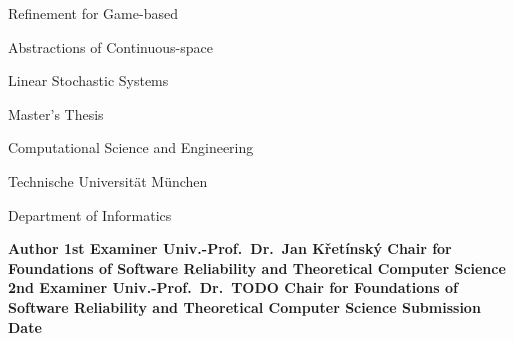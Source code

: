 \startalignment[flushright]
    \dontleavehmode
\stopalignment

\blank[25mm]

{ \CoverTitleFont
    \strut Refinement for Game-based\blank[4mm]
    \strut Abstractions of Continuous-space \blank[4mm]
    \strut Linear Stochastic Systems
}

\blank[85mm]

Master's Thesis

Computational Science and Engineering

Technische Universität München

Department of Informatics

\blank[20mm]

\starttable[s0|lp(45mm)|lp(115mm)|]
    \NC \bf Author \NC \Author \NC \AR
    \SR
    \NC \bf 1st Examiner \NC Univ.-Prof.\ Dr.\ Jan Křetínský \NC \AR
    \NC \NC Chair for Foundations of Software Reliability and Theoretical Computer Science \NC \AR
    \SR
    \NC \bf 2nd Examiner \NC Univ.-Prof.\ Dr.\ TODO \NC \AR
    \NC \NC Chair for Foundations of Software Reliability and Theoretical Computer Science \NC \AR
    \SR
    \NC \bf Submission Date \NC \DateOfCompletion \NC \AR
\stoptable

